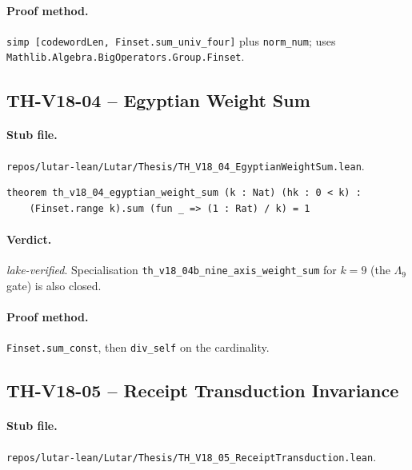 \paragraph{Proof method.} \texttt{simp [codewordLen, Finset.sum\_univ\_four]}
plus \texttt{norm\_num}; uses
\texttt{Mathlib.Algebra.BigOperators.Group.Finset}.

\subsection{TH-V18-04 -- Egyptian Weight Sum}
\label{sub:thv18-04}

\paragraph{Stub file.}
\texttt{repos/lutar-lean/Lutar/Thesis/TH\_V18\_04\_EgyptianWeightSum.lean}.

\begin{theorem}
\label{thm:thv18-04}
\begin{verbatim}
theorem th_v18_04_egyptian_weight_sum (k : Nat) (hk : 0 < k) :
    (Finset.range k).sum (fun _ => (1 : Rat) / k) = 1
\end{verbatim}
\end{theorem}

\paragraph{Verdict.} \emph{lake-verified}. Specialisation
\texttt{th\_v18\_04b\_nine\_axis\_weight\_sum} for $k = 9$ (the
$\Lambda_9$ gate) is also closed.

\paragraph{Proof method.} \texttt{Finset.sum\_const}, then
\texttt{div\_self} on the cardinality.

\subsection{TH-V18-05 -- Receipt Transduction Invariance}
\label{sub:thv18-05}

\paragraph{Stub file.}
\texttt{repos/lutar-lean/Lutar/Thesis/TH\_V18\_05\_ReceiptTransduction.lean}.

